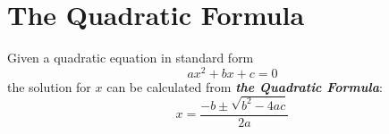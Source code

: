 \section*{The Quadratic Formula}

\begin{center}
\begin{tcolorbox}[width=5.5in]
    Given a quadratic equation in standard form 
    {\LARGE
        \[
            a x^2 + bx + c = 0
        \]
    }
    the solution for $x$ can be calculated from
    {\bfseries\itshape the Quadratic Formula}:
    {\LARGE
        \[
            x = \frac
                {-b \pm \sqrt{b^2 - 4ac}}
                {2a}
        \]
    }
\end{tcolorbox}
\end{center}


